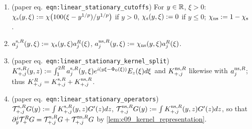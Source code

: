 \begin{definition}
  \label{def:c09_stationary_split}
  \begin{enumerate}
    \item (paper eq.~\texttt{eqn:linear\_stationary\_cutoffs}) For $y\in\mathbb{R}$, $\xi>0$: $\chi_{\textup{s}}(y,\xi):=\chi\bigl(100(\xi-y^{1/p})/y^{1/p}\bigr)$ if $y>0$,
      $\chi_{\textup{s}}(y,\xi):=0$ if $y\le0$; $\chi_{\textup{ns}}:=1-\chi_{\textup{s}}$.
    \item $a_j^{\textup{s},R}(y,\xi):=\chi_{\textup{s}}(y,\xi)a_j^R(\xi)$, $a_j^{\textup{ns},R}(y,\xi):=\chi_{\textup{ns}}(y,\xi)a_j^R(\xi)$.
    \item (paper eq.~\texttt{eqn:linear\_stationary\_kernel\_split}) $K_{+,j}^{\textup{s},R}(y,z):=\int_1^{2R}a_j^{\textup{s},R}(y,\xi)e^{i(y\xi-\Phi_0(\xi))}E_z(\xi)d\xi$ and
      $K_{+,j}^{\textup{ns},R}$ likewise with $a_j^{\textup{ns},R}$; thus $K_{+,j}^R=K_{+,j}^{\textup{s},R}+K_{+,j}^{\textup{ns},R}$.
    \item (paper eq.~\texttt{eqn:linear\_stationary\_operators}) $\mathcal{T}_{+,j}^{\textup{s},R}G(y):=\int K_{+,j}^{\textup{s},R}(y,z)G'(z)dz$, $\mathcal{T}_{+,j}^{\textup{ns},R}G(y):=\int K_{+,j}^{\textup{ns},R}(y,z)G'(z)dz$,
      so that $\partial_y^j\mathcal{T}_+^RG=\mathcal{T}_{+,j}^{\textup{s},R}G+\mathcal{T}_{+,j}^{\textup{ns},R}G$ by \cref{lem:c09_kernel_representation}.
  \end{enumerate}
\end{definition}

